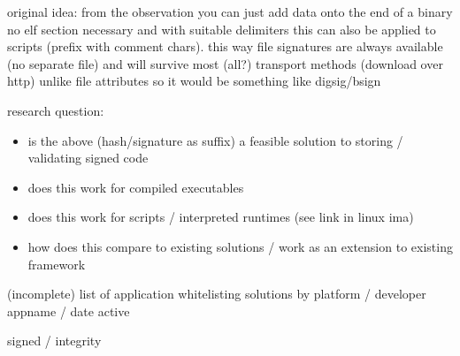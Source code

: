 \documentclass[]{article}
\date{}
\providecommand{\tightlist}{%
  \setlength{\itemsep}{0pt}\setlength{\parskip}{0pt}}
\begin{document}
original idea: from the observation you can just add data onto the end
of a binary no elf section necessary and with suitable delimiters this
can also be applied to scripts (prefix with comment chars). this way
file signatures are always available (no separate file) and will survive
most (all?) transport methods (download over http) unlike file
attributes so it would be something like digsig/bsign

research question:

\begin{itemize}
\tightlist
\item
  is the above (hash/signature as suffix) a feasible solution to storing
  / validating signed code
\item
  does this work for compiled executables
\item
  does this work for scripts / interpreted runtimes (see link in linux
  ima)
\item
  how does this compare to existing solutions / work as an extension to
  existing framework
\end{itemize}

(incomplete) list of application whitelisting solutions by platform /
developer appname / date active

signed / integrity
\end{document}
